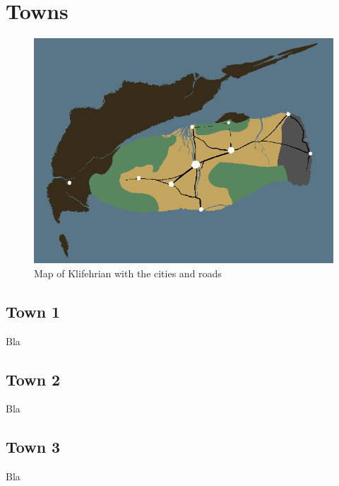 \documentclass[a4paper,12pt]{book}
\begin{document}
\section{Towns}
\begin{figure}[h]
	\centering
		\includegraphics[scale=2]{worldmap_cities.png}
	\caption{Map of Klifehrian with the cities and roads}
	\label{fig:worldmap_cities}
\end{figure}
\subsection{Town 1}
Bla
\subsection{Town 2}
Bla
\subsection{Town 3}
Bla
\end{document}
